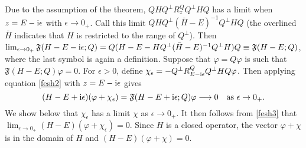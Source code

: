 \documentclass[letterpaper,onecolumn,11pt,accepted=2021-12-09]{quantumarticle}
\numberwithin{equation}{section}
\renewcommand{\i}{{\rm i}}
\begin{document}
Due to the assumption of the theorem, $QHQ^\perp R_z^Q Q^\perp HQ$ has a limit when $z=E-\i \epsilon$ with $\epsilon \rightarrow 0_+$. Call this limit $QHQ^\perp (\bar H-E)^{-1} Q^\perp HQ$ (the overlined $\bar H$ indicates that $H$ is restricted to the range of $Q^\perp$).  Then $\lim_{\epsilon\rightarrow 0_+}{\mathfrak F}(H-E-\i\epsilon;Q) = Q(H-E-HQ^\perp(\bar H-E)^{-1}Q^\perp H)Q \equiv {\mathfrak F}(H-E;Q)$, where the last symbol is again a definition.  Suppose that $\varphi=Q\varphi$ is such that ${\mathfrak F}(H-E;Q)\varphi=0$. For $\epsilon>0$, define $\chi_\epsilon =-Q^\perp R^Q_{E-\i\epsilon} Q^\perp HQ\varphi$. Then applying equation \eqref{fesh2} with $z=E-\i\epsilon$ gives
\begin{equation}
(H-E+\i\epsilon) (\varphi+\chi_\epsilon) = {\mathfrak F}(H-E+\i\epsilon;Q)\varphi\longrightarrow 0 \quad \mbox{as $\epsilon\rightarrow 0_+$.}
\label{fesh3}
\end{equation}
We show below that $\chi_\epsilon$ has a limit $\chi$ as $\epsilon\rightarrow 0_+$. It then follows from \eqref{fesh3}  that $\lim_{\epsilon\rightarrow 0_+}(H-E)(\varphi+ \chi_\epsilon)=0$. Since $H$ is a closed operator, the vector $\varphi+\chi$ is in the domain of $H$ and $(H-E)(\varphi+\chi)=0$. 
\end{document}
